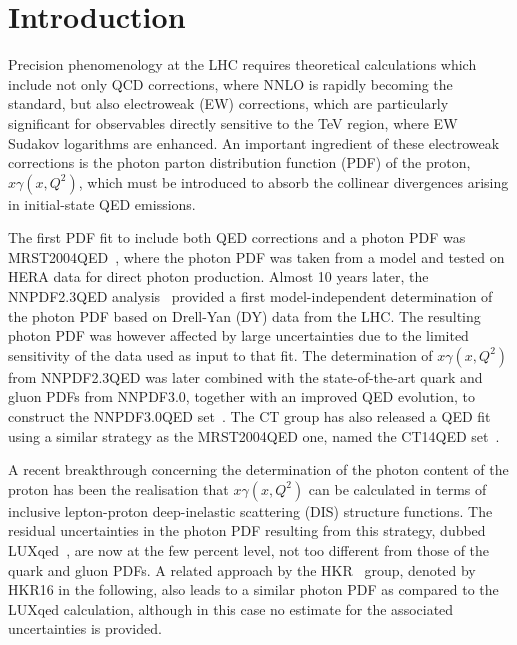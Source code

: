 \section{Introduction}

Precision phenomenology at the LHC requires theoretical calculations
which include not only QCD corrections, where NNLO is rapidly becoming
the standard, but also electroweak (EW) corrections, which are
particularly significant for observables directly sensitive to the TeV
region, where EW Sudakov logarithms are enhanced.
%
An important ingredient of these electroweak corrections is the photon
parton distribution function (PDF) of the proton, $x\gamma(x,Q^2)$, which must be introduced to absorb
the collinear divergences arising in initial-state QED emissions.

The first PDF fit to include both QED corrections and a photon PDF was
MRST2004QED~\cite{Martin:2004dh}, where the photon PDF was taken from
a model and tested on HERA data for direct photon production.
%
Almost 10 years later, the NNPDF2.3QED analysis~\cite{Ball:2012cx,Ball:2013hta} provided a
first model-independent determination of the photon PDF based on
Drell-Yan (DY) data from the LHC.
%
The resulting photon PDF was however affected by large uncertainties
due to the limited sensitivity of the data used as input to that fit.
%
The determination of $x\gamma(x,Q^2)$ from NNPDF2.3QED was later combined
with the state-of-the-art quark and gluon
PDFs from NNPDF3.0, together with an improved QED evolution,
to construct the NNPDF3.0QED set~\cite{Bertone:2016ume,Ball:2014uwa}.
%
The CT group has also  released a QED fit using a similar
strategy as the MRST2004QED one, named the CT14QED set~\cite{Schmidt:2015zda}.

A recent breakthrough concerning the determination of the photon content of
the proton
has been the realisation that  $x\gamma(x,Q^2)$
can be calculated in terms of
inclusive lepton-proton deep-inelastic scattering (DIS) structure functions.
%
The residual uncertainties in the photon PDF resulting from this
strategy, dubbed LUXqed~\cite{Manohar:2016nzj}, are now at the few
percent level, not too different from those
of the quark and gluon PDFs.
%
A related approach by the HKR~\cite{Harland-Lang:2016apc}
group, denoted by HKR16 in the following, also leads to a similar photon PDF
as compared to the LUXqed calculation, although in this case no estimate
for the associated uncertainties is provided.

